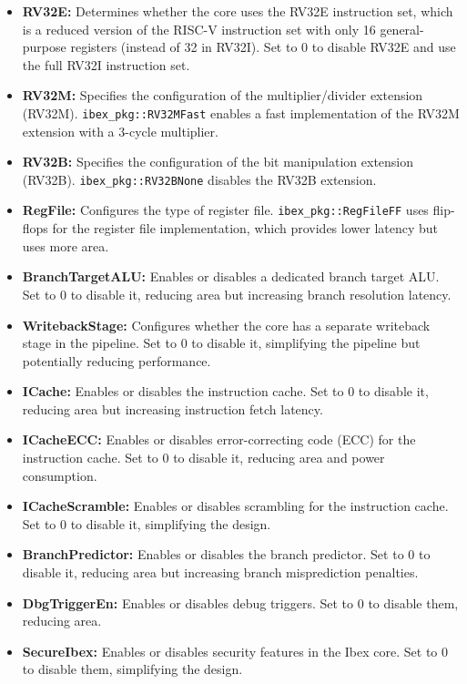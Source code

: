 \documentclass{article}
\begin{document}
\begin{itemize}
    \item \textbf{RV32E:} Determines whether the core uses the RV32E instruction set, which is a reduced version of the RISC-V instruction set with only 16 general-purpose registers (instead of 32 in RV32I). Set to 0 to disable RV32E and use the full RV32I instruction set.
    \item \textbf{RV32M:} Specifies the configuration of the multiplier/divider extension (RV32M). \texttt{ibex\_pkg::RV32MFast} enables a fast implementation of the RV32M extension with a 3-cycle multiplier.
    \item \textbf{RV32B:} Specifies the configuration of the bit manipulation extension (RV32B). \texttt{ibex\_pkg::RV32BNone} disables the RV32B extension.
    \item \textbf{RegFile:} Configures the type of register file. \texttt{ibex\_pkg::RegFileFF} uses flip-flops for the register file implementation, which provides lower latency but uses more area.
    \item \textbf{BranchTargetALU:} Enables or disables a dedicated branch target ALU. Set to 0 to disable it, reducing area but increasing branch resolution latency.
    \item \textbf{WritebackStage:} Configures whether the core has a separate writeback stage in the pipeline. Set to 0 to disable it, simplifying the pipeline but potentially reducing performance.
    \item \textbf{ICache:} Enables or disables the instruction cache. Set to 0 to disable it, reducing area but increasing instruction fetch latency.
    \item \textbf{ICacheECC:} Enables or disables error-correcting code (ECC) for the instruction cache. Set to 0 to disable it, reducing area and power consumption.
    \item \textbf{ICacheScramble:} Enables or disables scrambling for the instruction cache. Set to 0 to disable it, simplifying the design.
    \item \textbf{BranchPredictor:} Enables or disables the branch predictor. Set to 0 to disable it, reducing area but increasing branch misprediction penalties.
    \item \textbf{DbgTriggerEn:} Enables or disables debug triggers. Set to 0 to disable them, reducing area.
    \item \textbf{SecureIbex:} Enables or disables security features in the Ibex core. Set to 0 to disable them, simplifying the design.

\end{itemize}
\end{document}
